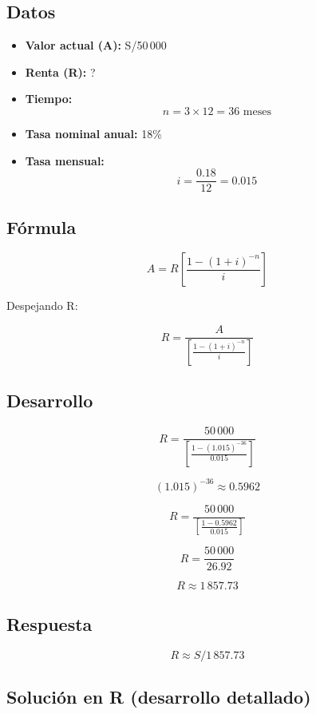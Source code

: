 \documentclass[12pt]{article}
\begin{document}
\subsection*{Datos}

\begin{itemize}
\item \textbf{Valor actual (A):} S/50\,000
\item \textbf{Renta (R):} ?
\item \textbf{Tiempo:}
\[
n = 3 \times 12 = 36 \text{ meses}
\]
\item \textbf{Tasa nominal anual:} 18\%
\item \textbf{Tasa mensual:}
\[
i = \frac{0.18}{12} = 0.015
\]
\end{itemize}

\subsection*{Fórmula}

\[
A = R\left[\frac{1-(1+i)^{-n}}{i}\right]
\]

Despejando R:

\[
R = \frac{A}{\left[\frac{1-(1+i)^{-n}}{i}\right]}
\]

\subsection*{Desarrollo}

\[
R = \frac{50\,000}{\left[\frac{1-(1.015)^{-36}}{0.015}\right]}
\]

\[
(1.015)^{-36} \approx 0.5962
\]

\[
R = \frac{50\,000}{\left[\frac{1-0.5962}{0.015}\right]}
\]

\[
R = \frac{50\,000}{26.92}
\]

\[
R \approx 1\,857.73
\]

\subsection*{Respuesta}

\[
\boxed{R \approx S/1\,857.73}
\]

\subsection*{Solución en R (desarrollo detallado)}
\end{document}
